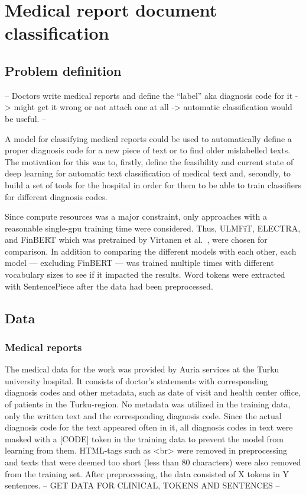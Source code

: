 \chapter{Medical report document classification} \label{Medical report document classification}

\section{Problem definition} \label{Problem definition}

-- Doctors write medical reports and define the ``label'' aka diagnosis code for it -> might get it wrong or not attach one at all -> automatic classification would be useful. --

A model for classifying medical reports could be used to automatically define a proper diagnosis code for a new piece of text or to find older mislabelled texts.
The motivation for this was to, firstly, define the feasibility and current state of deep learning for automatic text classification of medical text and, secondly, to build a set of tools for the hospital in order for them to be able to train classifiers for different diagnosis codes.

Since compute resources was a major constraint, only approaches with a reasonable single-gpu training time were considered.
Thus, ULMFiT, ELECTRA, and FinBERT which was pretrained by Virtanen et al.~\cite{virtanen2019}, were chosen for comparison.
In addition to comparing the different models with each other, each model --- excluding FinBERT --- was trained multiple times with different vocabulary sizes to see if it impacted the results.
Word tokens were extracted with SentencePiece after the data had been preprocessed.

\section{Data} \label{Data}
\subsection{Medical reports}\label{Medical reports}
The medical data for the work was provided by Auria services at the Turku university hospital.
It consists of doctor's statements with corresponding diagnosis codes and other metadata, such as date of visit and health center office, of patients in the Turku-region.
No metadata was utilized in the training data, only the written text and the corresponding diagnosis code.
Since the actual diagnosis code for the text appeared often in it, all diagnosis codes in text were masked with a [CODE] token in the training data to prevent the model from learning from them.
HTML-tags such as <br> were removed in preprocessing and texts that were deemed too short (less than 80 characters) were also removed from the training set.
After preprocessing, the data consisted of X tokens in Y sentences.
-- GET DATA FOR CLINICAL, TOKENS AND SENTENCES --

